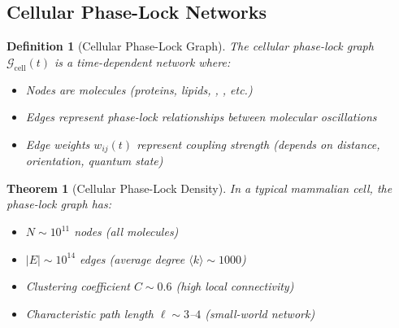 \documentclass[12pt,a4paper]{article}
\newtheorem{theorem}{Theorem}
\newtheorem{definition}{Definition}
\begin{document}
\subsection{Cellular Phase-Lock Networks}

\begin{definition}[Cellular Phase-Lock Graph]
\label{def:cellular_phase_lock}
The cellular phase-lock graph $\mathcal{G}_{\text{cell}}(t)$ is a time-dependent network where:
\begin{itemize}
\item Nodes are molecules (proteins, lipids, , , etc.)
\item Edges represent phase-lock relationships between molecular oscillations
\item Edge weights $w_{ij}(t)$ represent coupling strength (depends on distance, orientation, quantum state)
\end{itemize}
\end{definition}

\begin{theorem}[Cellular Phase-Lock Density]
\label{thm:cellular_density}
In a typical mammalian cell, the phase-lock graph has:
\begin{itemize}
\item $N \sim 10^{11}$ nodes (all molecules)
\item $|E| \sim 10^{14}$ edges (average degree $\langle k \rangle \sim 1000$)
\item Clustering coefficient $C \sim 0.6$ (high local connectivity)
\item Characteristic path length $\ell \sim 3$--$4$ (small-world network)
\end{itemize}
\end{theorem}
\end{document}
